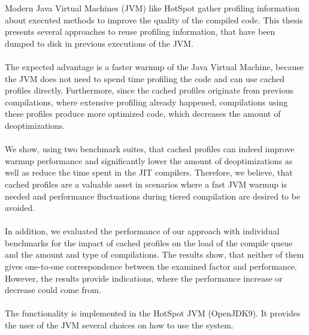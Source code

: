Modern Java Virtual Machines (JVM) like HotSpot gather profiling information about executed methods to improve the quality of the compiled code.
This thesis presents several approaches to reuse profiling information, that have been dumped to disk in previous executions of the JVM.
\\\\
The expected advantage is a faster warmup of the Java Virtual Machine, because the JVM does not need to spend time profiling the code and can use cached profiles directly.
Furthermore, since the cached profiles originate from previous compilations, where extensive profiling already happened, compilations using these profiles produce more optimized code, which decreases the amount of deoptimizations.
\\\\
We show, using two benchmark suites, that cached profiles can indeed improve warmup performance and significantly lower the amount of deoptimizations as well as reduce the time spent in the JIT compilers.
Therefore, we believe, that cached profiles are a valuable asset in scenarios where a fast JVM warmup is needed and performance fluctuations during tiered compilation are desired to be avoided.
\\\\
In addition, we evaluated the performance of our approach with individual benchmarks for the impact of cached profiles on the load of the compile queue and the amount and type of compilations. The results show, that neither of them gives one-to-one correspondence between the examined factor and performance. However, the results provide indications, where the performance increase or decrease could come from.
\\\\
The functionality is implemented in the HotSpot JVM (OpenJDK9). It provides the user of the JVM several choices on how to use the system.
